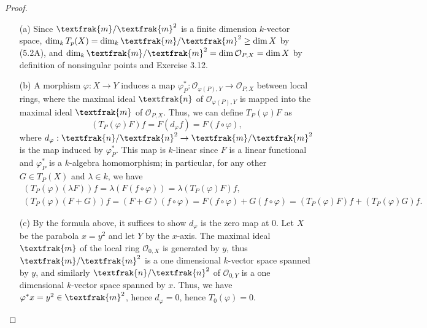 \documentclass[12pt]{article}
\newcommand{\goth}[1]{\textfrak{#1}}
\newcommand{\OO}{\mathcal{O}}
\theoremstyle{definition}
\begin{document}
\begin{enumerate} [label=\textbf{\arabic*.}, leftmargin=-0.05em]
\begin{proof} $ $ \vspace{0pt}
    \begin{itemize}
        \item[(a)] Since $\goth{m} / \goth{m}^2$ is a finite dimension $k$-vector space, $\dim_k{T_p(X)} = \dim_k{\goth{m} / \goth{m}^2} \geq \dim{X}$ by (5.2A), and $\dim_k{\goth{m} / \goth{m}^2} = \dim{\OO_{P, X}} = \dim{X}$ by definition of nonsingular points and Exercise 3.12.

        \item[(b)] A morphism $\varphi : X \to Y$ induces a map $\varphi_{P}^* : \OO_{\varphi(P), Y} \to \OO_{P, X}$ between local rings, where the maximal ideal $\goth{n}$ of $\OO_{\varphi(P), Y}$ is mapped into the maximal ideal $\goth{m}$ of $\OO_{P, X}$. Thus, we can define $T_P(\varphi)F$ as
        \begin{equation*}
            (T_P(\varphi)F)f = F(d_\varphi f) = F(f \circ \varphi),
        \end{equation*}
        where $d_\varphi : \goth{n} / \goth{n}^2 \to \goth{m} / \goth{m}^2$ is the map induced by $\varphi_P^*$. This map is $k$-linear since $F$ is a linear functional and $\varphi_P^*$ is a $k$-algebra homomorphism; in particular, for any other $G \in T_P(X)$ and $\lambda \in k$, we have
        \begin{gather*}
            (T_P(\varphi)(\lambda F))f = \lambda (F(f \circ \varphi)) = \lambda(T_P(\varphi)F)f, \\
            (T_P(\varphi)(F + G))f = (F + G)(f \circ \varphi) = F(f \circ \varphi) + G(f \circ \varphi) = (T_P(\varphi)F)f + (T_P(\varphi)G)f.
        \end{gather*}
        \item[(c)] By the formula above, it suffices to show $d_\varphi$ is the zero map at $0$. Let $X$ be the parabola $x = y^2$ and let $Y$ by the $x$-axis. The maximal ideal $\goth{m}$ of the local ring $\OO_{0, X}$ is generated by $y$, thus $\goth{m} / \goth{m}^2$ is a one dimensional $k$-vector space spanned by $y$, and similarly $\goth{n} / \goth{n}^2$ of $\OO_{0, Y}$ is a one dimensional $k$-vector space spanned by $x$. Thus, we have $\varphi^* x = y^2 \in \goth{m}^2$, hence $d_\varphi = 0$, hence $T_0(\varphi) = 0$.
    \end{itemize} 
\end{proof}


\end{enumerate}
\end{document}
